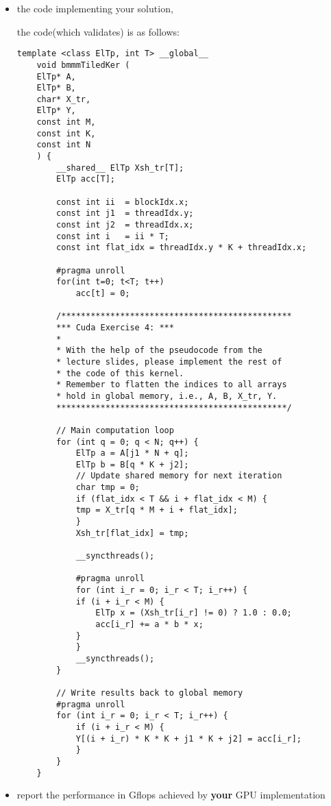 \documentclass{article}
\begin{document}
\begin{itemize}
    \item the code implementing your solution,
    
    the code(which validates) is as follows:
    
    \begin{lstlisting}[language=cuda]
    template <class ElTp, int T> __global__
    void bmmmTiledKer ( 
    ElTp* A,      
    ElTp* B, 
    char* X_tr,  
    ElTp* Y,
    const int M, 
    const int K, 
    const int N
    ) {
        __shared__ ElTp Xsh_tr[T];
        ElTp acc[T];

        const int ii  = blockIdx.x;
        const int j1  = threadIdx.y;
        const int j2  = threadIdx.x;
        const int i   = ii * T;
        const int flat_idx = threadIdx.y * K + threadIdx.x;

        #pragma unroll
        for(int t=0; t<T; t++)
            acc[t] = 0;

        /***********************************************
        *** Cuda Exercise 4: ***
        * 
        * With the help of the pseudocode from the
        * lecture slides, please implement the rest of
        * the code of this kernel.
        * Remember to flatten the indices to all arrays
        * hold in global memory, i.e., A, B, X_tr, Y.
        ***********************************************/

        // Main computation loop
        for (int q = 0; q < N; q++) {
            ElTp a = A[j1 * N + q];
            ElTp b = B[q * K + j2];
            // Update shared memory for next iteration
            char tmp = 0;
            if (flat_idx < T && i + flat_idx < M) {
            tmp = X_tr[q * M + i + flat_idx];
            }
            Xsh_tr[flat_idx] = tmp;

            __syncthreads();

            #pragma unroll
            for (int i_r = 0; i_r < T; i_r++) {
            if (i + i_r < M) {
                ElTp x = (Xsh_tr[i_r] != 0) ? 1.0 : 0.0;
                acc[i_r] += a * b * x;
            }
            }
            __syncthreads();
        }

        // Write results back to global memory
        #pragma unroll
        for (int i_r = 0; i_r < T; i_r++) {
            if (i + i_r < M) {
            Y[(i + i_r) * K * K + j1 * K + j2] = acc[i_r];
            }
        }
    }
    \end{lstlisting}

    \item report the performance in Gflops achieved by \textbf{your} GPU implementation
    

\end{itemize}
\end{document}

